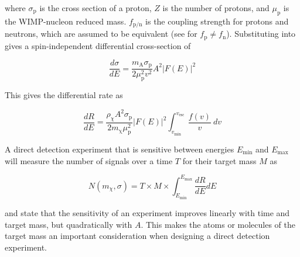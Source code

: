 \noindent where $\sigma_{\mathrm{p}}$ is the cross section of a proton, $Z$ is the number of protons, and $\mu_{\mathrm{p}}$ is
the WIMP-nucleon reduced mass. $f_{\mathrm{p/n}}$ is the coupling strength for protons and neutrons, which are assumed to be
equivalent (see  for $f_{\mathrm{p}} \neq f_{\mathrm{n}}$).  Substituting  into
 gives a spin-independent differential cross-section of

\begin{equation}
\frac{d \sigma}{dE} = \frac{m_{\mathrm{A}} \sigma_{\mathrm{p}}}{2 \mu_{\mathrm{p}}^{2} v^{2}}
 A^{2} \big| F(E) \big |^{2}
\end{equation}

\noindent This gives the differential rate as 

\begin{equation}
\frac{dR}{dE} = \frac{\rho_{\chi} A^{2} \sigma_{\mathrm{p}}}{2 m_{\mathrm{\chi}} \mu_{\mathrm{p}}^{2}}
  \big| F(E) \big |^{2} \int_{v_{\mathrm{min}}}^{v_{\mathrm{esc}}}
\frac{f(v)}{v}\ dv
\label{eq:dr_de_final}
\end{equation}

\noindent A direct detection experiment that is sensitive between energies $E_{\mathrm{min}}$ and $E_{\mathrm{max}}$ will measure
the number of signals over a time $T$ for their target mass $M$ as

\begin{equation} \label{eq:counts}
N ( m_{\chi}, \sigma) = T \times M \times \int_{E_{\mathrm{min}}}^{E_{\mathrm{max}}} \frac{dR}{dE} dE
\end{equation}

\noindent {} and  state that the sensitivity of an experiment improves linearly with time and
target mass, but quadratically with $A$.  This makes the atoms or molecules of the target mass an important consideration when
designing a direct detection experiment.







